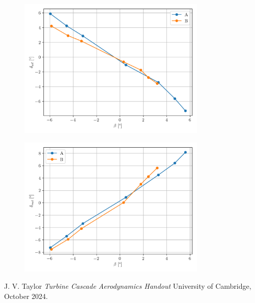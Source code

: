 \documentclass{article}
\begin{document}
\begin{figure}[H]
    \centering
    \includegraphics[width=0.8\textwidth]{Lat_Directional_Static_Stability_SHSS_2.png}
    \caption{}
    \label{fig:Lat_Directional_Static_Stability_SHSS_2}
\end{figure}

\begin{figure}[H]
    \centering
    \includegraphics[width=0.8\textwidth]{Lat_Directional_Static_Stability_SHSS_3.png}
    \caption{}
    \label{fig:Lat_Directional_Static_Stability_SHSS_3}
\end{figure}


\begin{thebibliography}{9}

  J. V. Taylor
  \emph{Turbine Cascade Aerodynamics Handout}
  University of Cambridge,
  October 2024.

\end{thebibliography}
\end{document}
